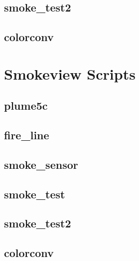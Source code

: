 \documentclass[11pt,twoside]{book}
\newcommand{\fdsinput}[1]{
{
\scriptsize

}
}
\begin{document}
\section{smoke\_test2}
\label{FDSsmoketest2}
\fdsinput{smoke_test2.fds}

\section{colorconv}
\label{FDScolorconv}
\fdsinput{colorconv.fds}

\chapter{Smokeview Scripts}
\label{smvscripts}
\section{plume5c}
\label{SSFplume5c}
\fdsinput{plume5c.ssf}

\section{fire\_line}
\label{SSFfireline}
\fdsinput{fire_line.ssf}

\section{smoke\_sensor}
\label{SSFsmokesensor}
\fdsinput{smoke_sensor.ssf}

\section{smoke\_test}
\label{SSFsmoketest}
\fdsinput{smoke_test.ssf}

\section{smoke\_test2}
\label{SSFsmoketest2}
\fdsinput{smoke_test2.ssf}

\section{colorconv}
\label{SSFcolorconv}
\fdsinput{colorconv.ssf}
\end{document}
